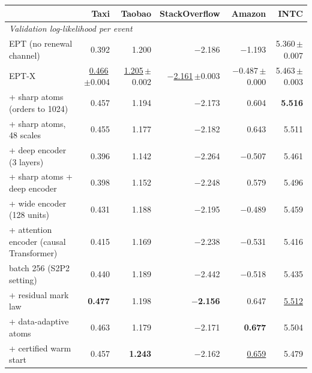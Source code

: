 \begin{tabular}{lrrrrr}
\toprule
& Taxi & Taobao & StackOverflow & Amazon & INTC \\
\midrule
\multicolumn{6}{l}{\textit{Validation log-likelihood per event}} \\[1pt]
\quad EPT (no renewal channel) & 0.392 & 1.200 & $-$2.186 & $-$1.193 & 5.360{\scriptsize\,$\pm$0.007} \\
\quad EPT-X & \underline{0.466}{\scriptsize\,$\pm$0.004} & \underline{1.205}{\scriptsize\,$\pm$0.002} & \underline{$-$2.161}{\scriptsize\,$\pm$0.003} & $-$0.487{\scriptsize\,$\pm$0.000} & 5.463{\scriptsize\,$\pm$0.003} \\
\quad \quad + sharp atoms (orders to 1024) & 0.457 & 1.194 & $-$2.173 & 0.604 & \textbf{5.516} \\
\quad \quad + sharp atoms, 48 scales & 0.455 & 1.177 & $-$2.182 & 0.643 & 5.511 \\
\quad \quad + deep encoder (3 layers) & 0.396 & 1.142 & $-$2.264 & $-$0.507 & 5.461 \\
\quad \quad + sharp atoms + deep encoder & 0.398 & 1.152 & $-$2.248 & 0.579 & 5.496 \\
\quad \quad + wide encoder (128 units) & 0.431 & 1.188 & $-$2.195 & $-$0.489 & 5.459 \\
\quad \quad + attention encoder (causal Transformer) & 0.415 & 1.169 & $-$2.238 & $-$0.531 & 5.416 \\
\quad \quad batch 256 (S2P2 setting) & 0.440 & 1.189 & $-$2.442 & $-$0.518 & 5.435 \\
\quad \quad + residual mark law & \textbf{0.477} & 1.198 & \textbf{$-$2.156} & 0.647 & \underline{5.512} \\
\quad \quad + data-adaptive atoms & 0.463 & 1.179 & $-$2.171 & \textbf{0.677} & 5.504 \\
\quad \quad + certified warm start & 0.457 & \textbf{1.243} & $-$2.162 & \underline{0.659} & 5.479 \\
\bottomrule
\end{tabular}